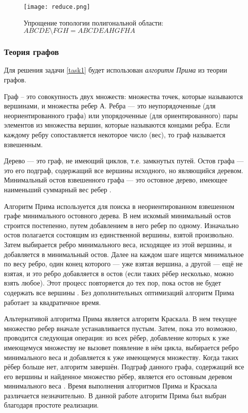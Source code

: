\begin{figure}[ht]
    \centering
    \texttt{[image: reduce.png]}
    \caption{Упрощение топологии полигональной области: $ABCDE \setminus FGH = ABCDEAHGFHA$}
    \label{fig:polysimp}
\end{figure}

\subsubsection{Теория графов}
\label{}

Для решения задачи \ref{task1} будет использован \textit{алгоритм Прима} из теории графов.

Граф – это совокупность двух множеств: множества точек, которые называются вершинами, и множества ребер А. Ребра --- это неупорядоченные (для неориентированного графа) или упорядоченные (для ориентированного) пары элементов из множества вершин, которые называются концами ребра. Если каждому ребру сопоставляется некоторое число (вес), то граф называется взвешенным. 

Дерево --- это граф, не имеющий циклов, т.е. замкнутых путей. Остов графа --- это его подграф, содержащий все вершины исходного, но являющийся деревом. Минимальный остов взвешенного графа --- это остовное дерево, имеющее наименьший суммарный вес ребер \cite{__2010}.

Алгоритм Прима используется для поиска в неориентированном взвешенном графе минимального остовного дерева. В нем искомый минимальный остов строится постепенно, путем добавлением в него ребер по одному. Изначально остов полагается состоящим из единственной вершины, взятой произвольно. Затем выбирается ребро минимального веса, исходящее из этой вершины, и добавляется в минимальный остов. Далее на каждом шаге ищется минимальное по весу ребро, один конец которого — уже взятая вершина, а другой — ещё не взятая, и это ребро добавляется в остов (если таких рёбер несколько, можно взять любое). Этот процесс повторяется до тех пор, пока остов не будет содержать все вершины \cite{prim_shortest_1957}. Без дополнительных оптимизаций алгоритм Прима работает за квадратичное время.

Альтернативой алгоритма Прима является алгоритм Краскала. В нем текущее множество ребер вначале устанавливается пустым. Затем, пока это возможно, проводится следующая операция: из всех рёбер, добавление которых к уже имеющемуся множеству не вызовет появление в нём цикла, выбирается ребро минимального веса и добавляется к уже имеющемуся множеству. Когда таких рёбер больше нет, алгоритм завершён. Подграф данного графа, содержащий все его вершины и найденное множество рёбер, является его остовным деревом минимального веса \cite{kruskal_shortest_1956}. Время выполнения алгоритмов Прима и Краскала различается незначительно. В данной работе алгоритм Прима был выбран благодаря простоте реализации.